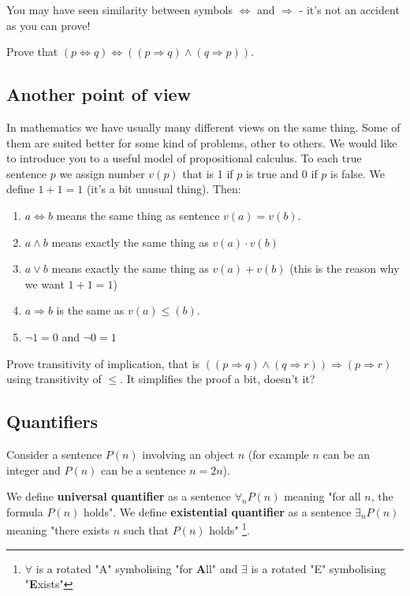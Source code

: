 You may have seen similarity between symbols $\Leftrightarrow$ and $\Rightarrow$ - it's not an accident as you can prove!
\begin{exercise}
  Prove that $(p\Leftrightarrow q)\Leftrightarrow ((p\Rightarrow q) \wedge (q\Rightarrow p))$.
\end{exercise}

\subsection{Another point of view}
In mathematics we have usually many different views on the same thing. Some of them are suited better for some kind of problems, other to others.
We would like to introduce you to a useful model of propositional calculus. To each true sentence $p$ we assign number $v(p)$
that is 1 if $p$ is true and 0 if $p$ is false. We define $1+1=1$
(it's a bit unusual thing). Then:
\begin{enumerate}
  \item $a\Leftrightarrow b$ means the same thing as sentence $v(a)=v(b)$.
  \item $a\wedge b$ means exactly the same thing as $v(a)\cdot v(b)$
  \item $a\vee b$ means exactly the same thing as $v(a)+v(b)$ (this is the reason why we want $1+1=1$)
  \item $a\Rightarrow b$ is the same as $v(a)\le (b)$.
  \item $\neg 1 = 0$ and $\neg 0=1$
\end{enumerate}

\begin{exercise}
  Prove transitivity of implication, that is $((p\Rightarrow q)\wedge (q\Rightarrow r)) \Rightarrow (p\Rightarrow r)$ using transitivity of $\le$.
  It simplifies the proof a bit, doesn't it?
\end{exercise}

\subsection{Quantifiers}
Consider a sentence $P(n)$ involving an object $n$ (for example $n$ can be an integer and $P(n)$ can be a sentence $n=2n$).
\begin{definition}
  We define \textbf{universal quantifier}
  as a sentence $\forall_n P(n)$ meaning "for all $n$, the formula $P(n)$ holds".
  We define \textbf{existential quantifier} as a sentence $\exists_n P(n)$ meaning "there exists $n$ such that $P(n)$ holds"
  \footnote{$\forall$ is a rotated "A" symbolising "for \textbf{A}ll" and $\exists$ is a rotated "E" symbolising "\textbf{E}xists"}.
\end{definition}

